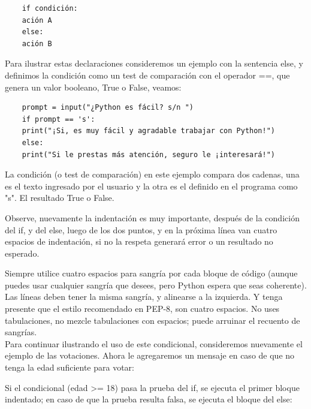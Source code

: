 \begin{lstlisting}
	if condición:
	ación A
	else:
	ación B
\end{lstlisting}

Para ilustrar estas declaraciones consideremos un ejemplo con la sentencia {\ttfamily else}, y definimos la condición como un test de comparación con el operador {\ttfamily ==}, que genera un valor booleano, {\ttfamily True} o {\ttfamily False}, veamos: \vspace{0.15cm}


\hspace{-2.5cm}{\ttfamily \scriptsize dos\_}

\vspace{-0.2cm}
\hspace{-2.5cm}{\ttfamily \scriptsize opciones.py}\vspace{-0.84cm}
\begin{lstlisting}
	prompt = input("¿Python es fácil? s/n ")
	if prompt == 's':
	print("¡Si, es muy fácil y agradable trabajar con Python!")
	else:
	print("Si le prestas más atención, seguro le ¡interesará!")
\end{lstlisting}

La condición (o test de comparación) en este ejemplo compara  dos cadenas, una es el texto ingresado por el usuario y la otra es el definido en el programa como "s".  El resultado  {\ttfamily True} o  {\ttfamily False}.

Observe, nuevamente la indentación es muy importante, después de la condición del {\ttfamily if}, y del {\ttfamily else}, luego de los dos puntos, y en la próxima línea van cuatro espacios de indentación, si no la respeta generará  error o un resultado no  esperado.

Siempre utilice cuatro espacios para sangría por cada bloque de código (aunque puedes usar cualquier sangría que desees, pero Python espera que seas coherente). Las líneas deben tener la misma sangría, y alinearse a la izquierda. Y tenga presente que el estilo recomendado en PEP-8, son  cuatro espacios. No uses tabulaciones, no mezcle tabulaciones con espacios; puede arruinar el recuento de sangrías.\\


Para continuar ilustrando el uso de este condicional, consideremos nuevamente el ejemplo de las votaciones. Ahora le agregaremos un mensaje en caso de que no tenga la edad suficiente para votar:


Si el condicional ({\ttfamily edad >= 18}) pasa la prueba  del {\ttfamily if}, se ejecuta el primer bloque indentado; en caso de que  la prueba resulta falsa, se ejecuta el bloque del {\ttfamily else}:


